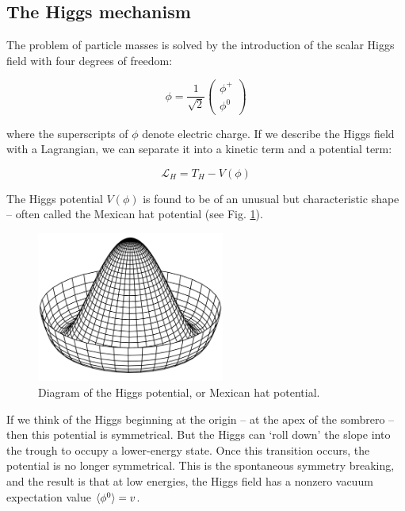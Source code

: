 \subsection{The Higgs mechanism}
The problem of particle masses is solved by the introduction of the scalar Higgs field with four degrees of freedom:

\begin{equation}
	\phi = \frac{1}{\sqrt{2}} \begin{pmatrix}
	\phi^+ \\
	\phi^0
	\end{pmatrix}
\label{higgs-field}
\end{equation}

where the superscripts of $\phi$ denote electric charge. If we describe the Higgs field with a Lagrangian, we can separate it into a kinetic term and a potential term:

\begin{equation}
	\mathcal{L}_{H} = T_H - V(\phi)
\label{eq:lagrangian-higgs}
\end{equation}

The Higgs potential $V(\phi)$ is found to be of an unusual but characteristic shape -- often called the Mexican hat potential (see Fig. \ref{figure:colliders/mexican-hat}).

\begin{figure}[h]
	\centering
	\includegraphics[width=0.55\textwidth]{../Pictures/MexicanHatPotential.png}
	\caption{Diagram of the Higgs potential, or Mexican hat potential.}
	\label{figure:colliders/mexican-hat}
\end{figure}

If we think of the Higgs beginning at the origin -- at the apex of the sombrero -- then this potential is symmetrical. But the Higgs can `roll down' the slope into the trough to occupy a lower-energy state. Once this transition occurs, the potential is no longer symmetrical. This is the spontaneous symmetry breaking, and the result is that at low energies, the Higgs field has a nonzero vacuum expectation value $\braket{\phi^0} = v$.

